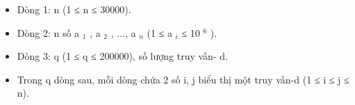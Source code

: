 \begin{itemize}
	\item     Dòng 1: n (1 ≤ n ≤ 30000).   
	\item     Dòng 2: n số a    $_     1    $    , a    $_     2    $    , ...,   a    $_     n    $    (1 ≤ a    $_     i    $    ≤   10    $^     6    $    ).   
	\item     Dòng 3: q (1 ≤ q ≤ 200000), số lượng truy vấn-  d.   
	\item     Trong q dòng sau, mỗi dòng chứa 2 số i, j biểu thị một   truy vấn-d (1 ≤ i ≤ j ≤ n).   
\end{itemize}